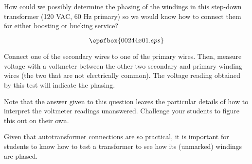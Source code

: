 

How could we possibly determine the phasing of the windings in this step-down transformer (120 VAC, 60 Hz primary) so we would know how to connect them for either boosting or bucking service?

$$\epsfbox{00244x01.eps}$$







Connect one of the secondary wires to one of the primary wires.  Then, measure voltage with a voltmeter between the other two secondary and primary winding wires (the two that are not electrically common).  The voltage reading obtained by this test will indicate the phasing.







Note that the answer given to this question leaves the particular details of how to interpret the voltmeter readings unanswered.  Challenge your students to figure this out on their own.

Given that autotransformer connections are so practical, it is important for students to know how to test a transformer to see how its (unmarked) windings are phased.




